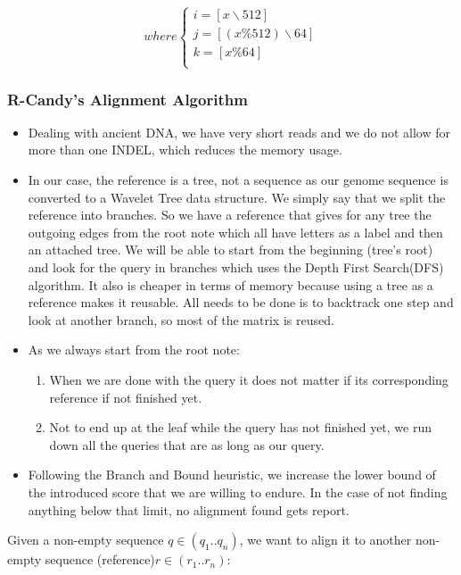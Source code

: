 \documentclass[11pt,a4paper]{report}
\begin{document}
\[ where
\begin{cases}
	i=[ x \backslash 512 ]\\
	j=[(x \% 512 )\backslash 64 ]\\
	k=[ x \% 64  ]\\
\end{cases}
\]




\subsubsection{R-Candy's Alignment Algorithm}
\label{R-Candy's Alignment Algorithm}

\begin{itemize}

\item Dealing with ancient DNA, we have very short reads and we do not allow for 
more than one INDEL, which reduces the memory usage.\\

\item 
In our case, the reference is a tree, not a sequence as our genome sequence is 
converted to a Wavelet Tree data structure.
We simply say that we split the reference into branches. So we have
a reference that gives for any tree the outgoing edges from the root note which all have 
letters  as a label and then an attached tree.
We will be able to start from the beginning (tree's root) and look for the query in 
branches which uses the Depth First Search(DFS) algorithm. 
It also is cheaper in terms of memory because using a tree as a reference makes
it reusable.
All needs to be done is to backtrack one step and look at another branch, so most
of the matrix is reused.\\


\item
As we always start from the root note:
\begin{enumerate}
 \item When we are done with the query it does not matter if its corresponding 
 reference if not finished yet.
 
 \item Not to end up at the leaf while the query has not finished yet,
we run down all the queries that are as long as our query.

\end{enumerate}

 \item Following the Branch and Bound heuristic, we increase the lower bound of the 
 introduced score that we are willing to endure. In the case of not finding anything 
 below that limit, no alignment found gets report.
 
\end{itemize}
Given a non-empty sequence $q\in (q_{1}..q_{n})$, we want to align it to 
another non-empty sequence (reference)$r\in (r_{1}..r_{n})$:\\\\
\end{document}
